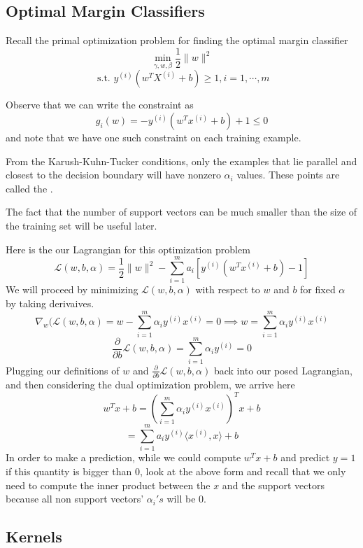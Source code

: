 \documentclass[12pt]{scrartcl}
\begin{document}
\subsection{Optimal Margin Classifiers}

Recall the primal optimization problem for finding the optimal margin
classifier
\[\underset{\gamma, w, \beta}{\min}\frac{1}{2}\lVert w \rVert^2\]
\[\text{ s.t. } y^{(i)} (w^TX^{(i)} + b) \geq 1, i = 1, \cdots, m\]

Observe that we can write the constraint as
\[g_i(w) = -y^{(i)}(w^Tx^{(i)} + b) + 1 \leq 0\]
and note that we have one such constraint on each training example.
\begin{lemma}
    From the Karush-Kuhn-Tucker conditions, only the examples that lie parallel and closest to the decision boundary will have nonzero $\alpha_i$ values. These points are called the .
\end{lemma}

\begin{note}
    The fact that the number of support vectors can be much smaller than the size of the training set will be useful later.
\end{note}

Here is the our Lagrangian for this optimization problem
\[\mathcal{L}(w, b, \alpha) = \frac{1}{2}\lVert w \rVert^2 - \sum_{i=1}^m a_i\left[ y^{(i)} (w^Tx^{(i)} + b) - 1\right]\]
We will proceed by minimizing $\mathcal{L}(w, b, \alpha)$ with respect to $w$
and $b$ for fixed $\alpha$ by taking derivaives.
\[\nabla_w(\mathcal{L}(w, b, \alpha) = w - \sum_{i=1}^m\alpha_iy^{(i)}x^{(i)} = 0 \implies w = \sum_{i=1}^m\alpha_iy^{(i)}x^{(i)}\]
\[\frac{\partial}{\partial b }\mathcal{L}(w, b, \alpha) = \sum_{i=1}^m \alpha_iy^{(i)} = 0\]
Plugging our definitions of $w$ and $\frac{\partial}{\partial b}\mathcal{L}(w, b, \alpha)$ back into our posed Lagrangian, and then
considering the dual optimization problem, we arrive here
\[w^Tx + b = (\sum_{i=1}^m \alpha_i y^{(i)}x^{(i)})^Tx + b\]
\[=\sum_{i=1}^ma_iy^{(i)}\langle x^{(i)}, x\rangle + b\]
In order to make a prediction, while we could compute $w^Tx+b$ and predict $y =
    1$ if this quantity is bigger than 0, look at the above form and recall that we
only need to compute the inner product between the $x$ and the support vectors
because all non support vectors' $\alpha_i's$ will be 0.

\subsection{Kernels}
\end{document}
